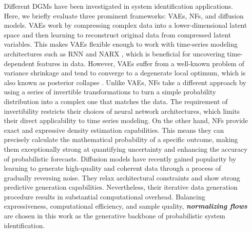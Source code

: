 Different \acp{DGM} have been investigated in system identification applications. Here, we briefly evaluate three prominent frameworks: \acp{VAE}, \acp{NF}, and diffusion models. \acp{VAE} work by compressing complex data into a lower-dimensional latent space and then learning to reconstruct original data from compressed latent variables. This makes \acp{VAE} flexible enough to work with time-series modeling architectures such as \acf{RNN} \citep{Girin_2021} and \acf{NARX} \citep{PANIAGUA2024200344}, which is beneficial for uncovering time-dependent features in data. However, \acp{VAE} suffer from a well-known problem of variance shrinkage \citep{asperti2020vae} and tend to converge to a degenerate local optimum, which is also known as posterior collapse \citep{wang2023vae}. Unlike \acp{VAE}, \acp{NF} take a different approach by using a series of invertible transformations to turn a simple probability distribution into a complex one that matches the data. The requirement of invertibility restricts their choices of neural network architectures, which limits their direct applicability to time series modeling. On the other hand, \acp{NF} provide exact and expressive density estimation capabilities. This means they can precisely calculate the mathematical probability of a specific outcome, making them exceptionally strong at quantifying uncertainty and enhancing the accuracy of probabilistic forecasts. Diffusion models have recently gained popularity by learning to generate high-quality and coherent data through a process of gradually reversing noise. They relax architectural constraints and show strong predictive generation capabilities. Nevertheless, their iterative data generation procedure results in substantial computational overhead. Balancing expressiveness, computational efficiency, and sample quality, {\bfseries\itshape normalizing flows} are chosen in this work as the generative backbone of probabilistic system identification.

